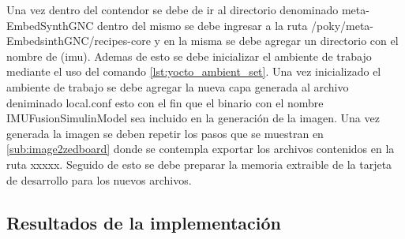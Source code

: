 Una vez dentro del contendor se debe de ir al directorio denominado meta-EmbedSynthGNC dentro del mismo se debe ingresar a la ruta /poky/meta-EmbedsinthGNC/recipes-core y en la misma se debe agregar un directorio con el nombre de (imu). Ademas de esto se debe inicializar el ambiente de trabajo mediante el uso del comando \ref{lst:yocto_ambient_set}. Una vez inicializado el ambiente de trabajo se debe agregar la nueva capa generada al archivo deniminado local.conf esto con el fin que el binario con el nombre IMUFusionSimulinModel sea incluido en la generación de la imagen. Una vez generada la imagen se deben repetir los pasos que se muestran en \ref{sub:image2zedboard} donde se contempla exportar los archivos contenidos en la ruta xxxxx. Seguido de esto se debe preparar la memoria extraible de la tarjeta de desarrollo para los nuevos archivos.

\newpage

\subsection{Resultados de la implementación}


